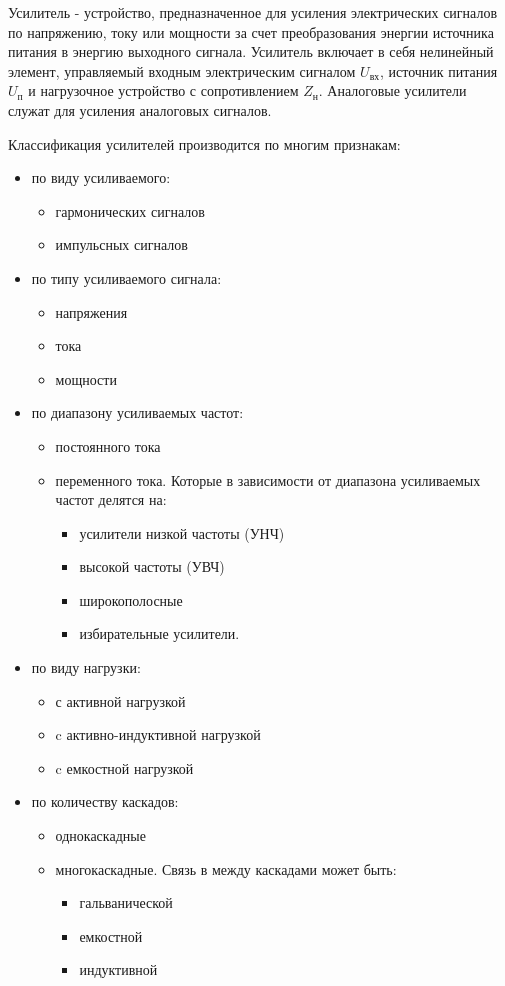\documentclass[unicode, 12pt, a4paper, oneside]{article}
\begin{document}
Усилитель - устройство, предназначенное для усиления электрических сигналов по напряжению, току или мощности за счет преобразования энергии источника питания в энергию выходного сигнала. Усилитель включает в себя нелинейный элемент, управляемый входным электрическим сигналом $U_\text{вх}$, источник питания $U_\text{п}$ и нагрузочное устройство с сопротивлением $Z_\text{н}$. Аналоговые усилители служат для усиления аналоговых сигналов.

Классификация усилителей производится по многим признакам:
\begin{itemize}
\item по виду усиливаемого:
	\begin{itemize}
	\item гармонических сигналов
	\item импульсных сигналов
	\end{itemize}
\item по типу усиливаемого сигнала:
	\begin{itemize}
	\item напряжения
	\item тока 
	\item мощности
	\end{itemize}
\item по диапазону усиливаемых частот:
	\begin{itemize}
	\item постоянного тока 
	\item переменного тока. Которые в зависимости от диапазона усиливаемых частот делятся на:
		\begin{itemize}
		\item усилители низкой частоты (УНЧ)
		\item высокой частоты (УВЧ)
		\item широкополосные
		\item избирательные усилители.
		\end{itemize}
	\end{itemize}
\item по виду нагрузки:
	\begin{itemize}
	\item с активной нагрузкой
	\item c активно-индуктивной нагрузкой
	\item c емкостной нагрузкой
	\end{itemize}
\item по количеству каскадов:
	\begin{itemize}
	\item однокаскадные 
	\item многокаскадные. Связь в между каскадами может быть:
		\begin{itemize}
		\item гальванической
		\item емкостной
		\item индуктивной
		\end{itemize}
	\end{itemize}
\end{itemize}
\end{document}
